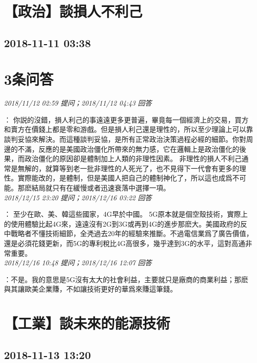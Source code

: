 \documentclass[twocolumn]{ctexart}
\begin{document}
\section{【政治】談損人不利己}
\subsection{2018-11-11 03:38}


\section{3条问答}

\textit{\hfill\noindent\small 2018/11/12 02:59 提问；2018/11/12 04:43 回答}

：
你説的沒錯，損人利己的事遠遠更多更普遍，畢竟每一個經濟上的交易，買方和賣方在價錢上都是零和游戲。但是損人利己還是理性的，所以至少理論上可以靠談判妥協來解決。而這種談判妥協，是所有正常政治決策過程必經的細節。你對周邊的不滿，反應的是美國政治僵化所帶來的無力感，它在邏輯上是政治僵化的後果，而政治僵化的原因卻是體制加上人類的非理性因素。 
非理性的損人不利己通常是無解的，就算等到老一批非理性的人死光了，也不見得下一代會有更多的理性。實際能改的，是體制，但是美國人把自己的體制神化了，所以這也成爲不可能。那麽結局就只有在緩慢或者迅速衰落中選擇一項。
\\

\textit{\hfill\noindent\small 2018/12/15 23:20 提问；2018/12/16 03:22 回答}

：
至少在歐、美、韓這些國家，4G早於中國。
5G原本就是個空殼技術，實際上的使用體驗比起4G來，遠遠沒有2G到3G或再到4G的進步那麽大。美國政府的反中戰略者不懂技術細節，全凴過去20年的經驗來推斷。不過電信業爲了廣告價值，還是必須花錢更新，而5G的專利稅比4G高很多，幾乎達到3G的水平，這對高通非常重要。
\\

\textit{\hfill\noindent\small 2018/12/16 10:48 提问；2018/12/16 12:07 回答}

：不是。我的意思是5G沒有太大的社會利益，主要就只是廠商的商業利益；那麽與其讓歐美企業賺，不如讓技術更好的華爲來賺這筆錢。
\\


\section{【工業】談未來的能源技術}
\subsection{2018-11-13 13:20}
\end{document}
